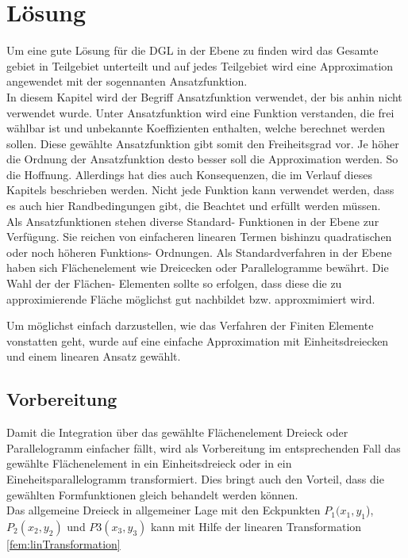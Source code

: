%
%
%
\section{Lösung
\label{fem:section:loesung}}
Um eine gute Lösung für die DGL in der Ebene zu finden wird das Gesamte gebiet in Teilgebiet unterteilt und auf jedes Teilgebiet wird eine Approximation angewendet mit der sogennanten Ansatzfunktion.\\
In diesem Kapitel wird der Begriff Ansatzfunktion verwendet, der bis anhin nicht verwendet wurde. Unter Ansatzfunktion wird eine Funktion verstanden, die frei wählbar ist und unbekannte Koeffizienten enthalten, welche berechnet werden sollen. Diese gewählte Ansatzfunktion gibt somit den Freiheitsgrad vor. Je höher die Ordnung der Ansatzfunktion desto besser soll die Approximation werden. So die Hoffnung. Allerdings hat dies auch Konsequenzen, die im Verlauf dieses Kapitels beschrieben werden. Nicht jede Funktion kann verwendet werden, dass es auch hier Randbedingungen gibt, die Beachtet und erfüllt werden müssen.\\

Als Ansatzfunktionen stehen diverse Standard- Funktionen in der Ebene zur Verfügung. Sie reichen von einfacheren linearen Termen bishinzu quadratischen oder noch höheren Funktions- Ordnungen. Als Standardverfahren in der Ebene haben sich Flächenelement wie Dreicecken oder Parallelogramme bewährt. Die Wahl der  der Flächen- Elementen sollte so erfolgen, dass diese die zu approximierende Fläche möglichst gut nachbildet bzw. approxmimiert wird.

Um möglichst einfach darzustellen, wie das Verfahren der Finiten Elemente vonstatten geht, wurde auf eine einfache Approximation mit Einheitsdreiecken und einem linearen Ansatz gewählt. 

\subsection{Vorbereitung}

Damit die Integration über das gewählte Flächenelement Dreieck oder Parallelogramm einfacher fällt, wird als Vorbereitung im entsprechenden Fall das gewählte Flächenelement in ein Einheitsdreieck oder in ein Eineheitsparallelogramm transformiert. Dies bringt auch den Vorteil, dass die gewählten Formfunktionen gleich behandelt werden können. \\
Das allgemeine Dreieck in allgemeiner Lage mit den Eckpunkten $P_1(x_1, y_1$), $ P_2(x_2, y_2)$ und $P3(x_3,y_3)$ kann mit Hilfe der linearen Transformation \ref{fem:linTransformation} 

